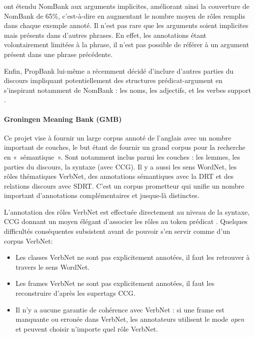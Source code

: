 \cite{gerber2010beyond} ont étendu NomBank aux arguments implicites, améliorant
ainsi la couverture de NomBank de 65\%, c'est-à-dire en augmentant le nombre
moyen de rôles remplis dans chaque exemple annoté. Il n'est pas rare que les
arguments soient implicites mais présents dans d'autres phrases. En effet, les
annotations étant volontairement limitées à la phrase, il n'est pas possible de
référer à un argument présent dans une phrase précédente.

Enfin, PropBank lui-même a récemment décidé d'inclure d'autres parties du
discours impliquant potentiellement des structures prédicat-argument en
s'inspirant notamment de NomBank : les noms, les adjectifs, et les verbes
support \citep{bonial2014propbank}.


\paragraph{Groningen Meaning Bank (GMB)}

Ce projet \citep{basile2014developing} vise à fournir un large corpus annoté de
l'anglais avec un nombre important de couches, le but étant de fournir un grand
corpus pour la recherche en «~sémantique~». Sont notamment inclus parmi les
couches : les lemmes, les parties du discours, la syntaxe (avec CCG). Il y a
aussi les sens WordNet, les rôles thématiques VerbNet, des annotations
sémantiques avec la DRT et des relations discours avec SDRT. C'est un corpus
prometteur qui unifie un nombre important d'annotations complémentaires et
jusque-là distinctes.

L'annotation des rôles VerbNet est effectuée directement au niveau de la
syntaxe, CCG donnant un moyen élégant d'associer les rôles au token prédicat
\citep{bos2012annotating}. Quelques difficultés conséquentes subsistent avant
de pouvoir s'en servir comme d'un corpus VerbNet:

\begin{itemize}
    \item Les classes VerbNet ne sont pas explicitement annotées, il faut les
        retrouver à travers le sens WordNet.
    \item Les frames VerbNet ne sont pas explicitement annotées, il faut les
        reconstruire d'après les supertags CCG.
    \item Il n'y a aucune garantie de cohérence avec VerbNet : si une frame est
        manquante ou erronée dans VerbNet, les annotateurs utilisent le mode
        \textit{open} et peuvent choisir n'importe quel rôle VerbNet.
\end{itemize}

